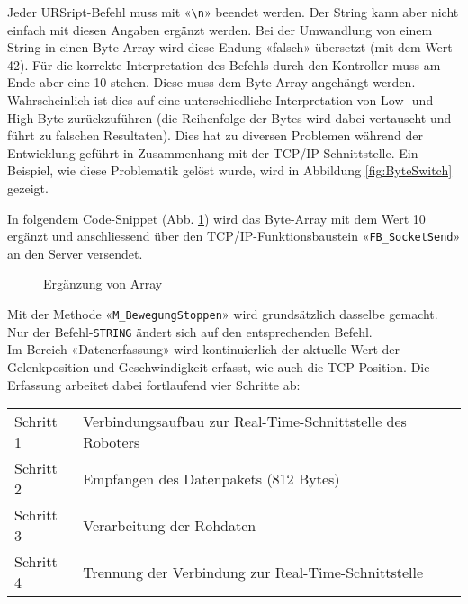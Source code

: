 		\newpage
		
		\begin{bfhNoteBox}
			Jeder URSript-Befehl muss mit «\verb|\n|» beendet werden. Der String kann aber nicht einfach mit diesen Angaben ergänzt werden. Bei der Umwandlung von einem String in einen Byte-Array wird diese Endung «falsch» übersetzt (mit dem Wert 42). Für die korrekte Interpretation des Befehls durch den Kontroller muss am Ende aber eine 10 stehen. Diese muss dem Byte-Array angehängt werden. Wahrscheinlich ist dies auf eine unterschiedliche Interpretation von Low- und High-Byte zurückzuführen (die Reihenfolge der Bytes wird dabei vertauscht und führt zu falschen Resultaten). Dies hat zu diversen Problemen während der Entwicklung geführt in Zusammenhang mit der TCP/IP-Schnittstelle. Ein Beispiel, wie diese Problematik gelöst wurde, wird in Abbildung \ref{fig:ByteSwitch} gezeigt. 
		\end{bfhNoteBox}
		\vspace{3mm}
		In folgendem Code-Snippet (Abb. \ref{fig:ArrayErgänzung}) wird das Byte-Array mit dem Wert 10 ergänzt und anschliessend über den TCP/IP-Funktionsbaustein «\verb|FB_SocketSend|» an den Server versendet. 
		
		\begin{figure}[h!]
			\centering
			\captionsetup{justification=centering}
			\caption{Ergänzung von Array}
			\label{fig:ArrayErgänzung}
		\end{figure}
		
		Mit der Methode «\verb|M_BewegungStoppen|» wird grundsätzlich dasselbe gemacht. Nur der Befehl-\verb|STRING| ändert sich auf den entsprechenden Befehl.
		\\
		Im Bereich «Datenerfassung» wird kontinuierlich der aktuelle Wert der Gelenkposition und Geschwindigkeit erfasst, wie auch die TCP-Position. Die Erfassung arbeitet dabei fortlaufend vier Schritte ab:
		
		\begin{tabularx}{\textwidth}{@{}>{}p{8em} X@{}}
			Schritt 1 & 
			Verbindungsaufbau zur Real-Time-Schnittstelle des Roboters
			\\
			Schritt 2 & 
			Empfangen des Datenpakets (812 Bytes)
			\\
			Schritt 3 & 
			Verarbeitung der Rohdaten   
			\\
			Schritt 4 & 
			Trennung der Verbindung zur Real-Time-Schnittstelle
			\\
		\end{tabularx}
		\\
		
